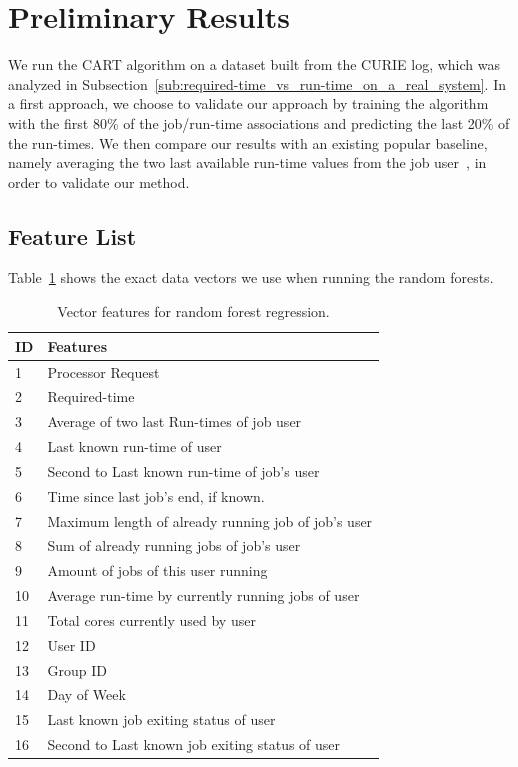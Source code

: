 \documentclass{article}
\begin{document}

  \section{Preliminary Results}
  \label{sec:preliminary_results}
  We run the CART algorithm on a dataset built from the CURIE log, which was analyzed in Subsection~\ref{sub:required-time_vs_run-time_on_a_real_system}. In a first approach, we choose to validate our approach by training the algorithm with the first 80\% of the job/run-time associations and predicting the last 20\% of the run-times. We then compare our results with an existing popular baseline, namely averaging the two last available run-time values from the job user~\cite{tsafir}, in order to validate our method.

  \subsection{Feature List}
  \label{sub:feature_list}
  Table~\ref{tab:features} shows the exact data vectors we use when running the random forests.

  \begin{table}[!ht]
    \centering
    \begin{tabular}{|l|l|}
      \hline
      ID & Features \\
      \hline
      1  &  Processor Request  \\
      2  &  Required-time  \\
      3  &  Average of two last Run-times of job user \\
      4  &  Last known run-time of user\\
      5  &  Second to Last known run-time of job's user \\
      6  &  Time since last job's end, if known. \\
      7  &  Maximum length of already running job of job's user\\
      8  &  Sum of already running jobs of job's user\\
      9  &  Amount of jobs of this user running \\
      10 &  Average run-time by currently running jobs of user\\
      11 &  Total cores currently used by user\\
      12 &  User ID \\
      13 &  Group ID\\
      14 &  Day of Week\\
      15 &  Last known job exiting status of user\\
      16 &  Second to  Last known job exiting status of user\\
      \hline
    \end{tabular}
    \caption{Vector features for random forest regression.}
    \label{tab:features}
  \end{table}
\end{document}
